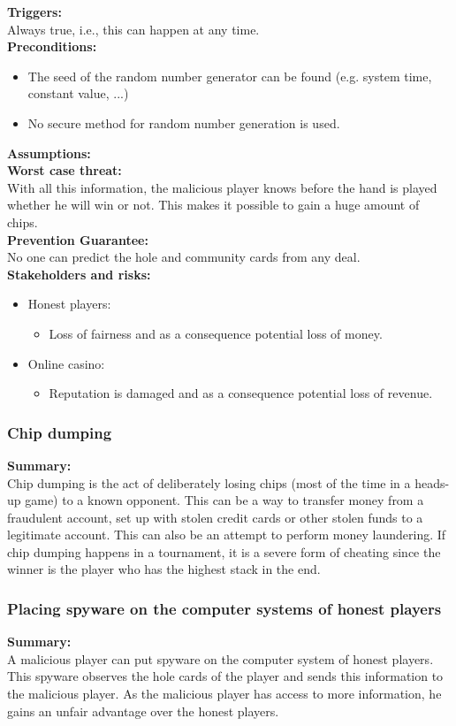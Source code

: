 \documentclass[a4paper,11pt]{report}
\begin{document}
\textbf{Triggers:}\\
Always true, i.e., this can happen at any time. \\
\textbf{Preconditions:}
\begin{itemize}
\item The seed of the random number generator can be found (e.g. system time, constant value, ...)
\item No secure method for random number generation is used.
\end{itemize}
\textbf{Assumptions:} \\
\textbf{Worst case threat:}\\
With all this information, the malicious player knows before the hand is played whether he will win or not. This makes it possible to gain a huge amount of chips.\\
\textbf{Prevention Guarantee:} \\
No one can predict the hole and community cards from any deal. \\
\textbf{Stakeholders and risks:}
\begin{itemize}
\item Honest players:
\begin{itemize}
\item Loss of fairness and as a consequence potential loss of money.
\end{itemize}
\item Online casino:
\begin{itemize}
\item Reputation is damaged and as a consequence potential loss of revenue.
\end{itemize}
\end{itemize}

\subsubsection{Chip dumping}
\textbf{Summary:} \\
Chip dumping is the act of deliberately losing chips (most of the time in a heads-up game) to a known opponent. This can be a way to transfer money from a fraudulent account, set up with stolen credit cards or other stolen funds to a legitimate account. This can also be an attempt to perform money laundering. If chip dumping happens in a tournament, it is a severe form of cheating since the winner is the player who has the highest stack in the end.
\subsubsection{Placing spyware on the computer systems of honest players}
\textbf{Summary:} \\
A malicious player can put spyware on the computer system of honest players. This spyware observes the hole cards of the player and sends this information to the malicious player. As the malicious player has access to more information, he gains an unfair advantage over the honest players.
\end{document}
